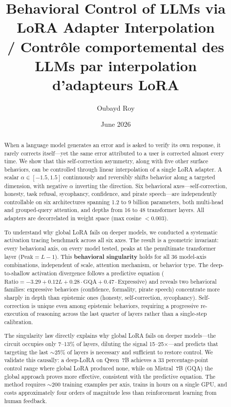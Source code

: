 \documentclass[11pt,a4paper]{article}
\title{Behavioral Control of LLMs via LoRA Adapter Interpolation\\
/ Contrôle comportemental des LLMs par interpolation d'adapteurs LoRA}
\author{Oubayd Roy}
\date{June 2026}
\begin{document}
\maketitle

\begin{abstract}
When a language model generates an error and is asked to verify its own response, it rarely corrects itself---yet the same error attributed to a user is corrected almost every time. We show that this self-correction asymmetry, along with five other surface behaviors, can be controlled through linear interpolation of a single LoRA adapter. A scalar $\alpha \in [-1.5, 1.5]$ continuously and reversibly shifts behavior along a targeted dimension, with negative $\alpha$ inverting the direction. Six behavioral axes---self-correction, honesty, task refusal, sycophancy, confidence, and pirate speech---are independently controllable on six architectures spanning 1.2 to 9 billion parameters, both multi-head and grouped-query attention, and depths from 16 to 48 transformer layers. All adapters are decorrelated in weight space (max cosine $< 0.003$).

To understand why global LoRA fails on deeper models, we conducted a systematic activation tracing benchmark across all six axes. The result is a geometric invariant: every behavioral axis, on every model tested, peaks at the penultimate transformer layer ($\text{Peak} = L-1$). This \textbf{behavioral singularity} holds for all 36 model-axis combinations, independent of scale, attention mechanism, or behavior type. The deep-to-shallow activation divergence follows a predictive equation ($\text{Ratio} = -3.29 + 0.12L + 0.28\cdot\text{GQA} + 0.47\cdot\text{Expressive}$) and reveals two behavioral families: expressive behaviors (confidence, formality, pirate speech) concentrate more sharply in depth than epistemic ones (honesty, self-correction, sycophancy). Self-correction is unique even among epistemic behaviors, requiring a progressive re-execution of reasoning across the last quarter of layers rather than a single-step calibration.

The singularity law directly explains why global LoRA fails on deeper models---the circuit occupies only 7--13\% of layers, diluting the signal 15--25$\times$---and predicts that targeting the last $\sim$25\% of layers is necessary and sufficient to restore control. We validate this causally: a deep-LoRA on Qwen~7B achieves a 33 percentage-point control range where global LoRA produced none, while on Mistral~7B (GQA) the global approach proves more effective, consistent with the predictive equation. The method requires $\sim$200 training examples per axis, trains in hours on a single GPU, and costs approximately four orders of magnitude less than reinforcement learning from human feedback.


\end{abstract}
\end{document}
